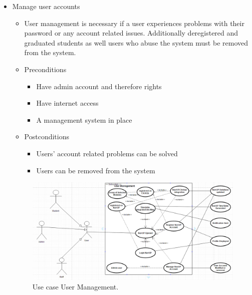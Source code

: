 \documentclass[12pt]{article}
\begin{document}
\begin{enumerate}
\begin{itemize}
				\item Manage user accounts
				\begin{itemize}
					\item User management is necessary if a user experiences problems with their password or any account related issues. Additionally deregistered and graduated students as well users who abuse the system must be removed from the system.
					\item Preconditions
					\begin{itemize}
						\item Have admin account and therefore rights
						\item Have internet access
						\item A management system in place
					\end{itemize}
					\item Postconditions
					\begin{itemize}
						\item Users’ account related problems can be solved
						\item Users can be removed from the system
					\end{itemize}
				\end{itemize}
				\begin{figure}
				    \includegraphics[width=\linewidth]{useCaseUserManagement.png}
				    \caption{Use case User Management.}
  \label{fig:userManagement}
				\end{figure}
			\end{itemize}
			

\end{enumerate}
\end{document}
